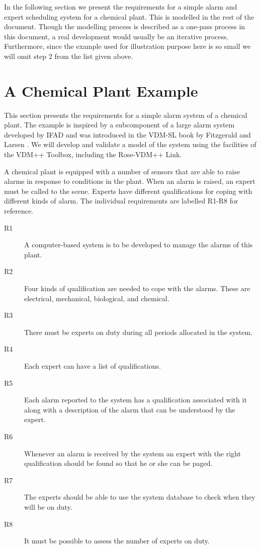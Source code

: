 \documentclass[\pformat,12pt,twoside]{article}
\begin{document}
In the following section we present the requirements for a simple 
alarm and expert scheduling system for a chemical plant. This 
is modelled in the rest of the document. Though the modelling 
process is described as a one-pass process in this document, 
a real development would usually be an iterative process. Furthermore,
since the example used for illustration purpose here is so
small we will omit step 2 from the list given above.

\section{A Chemical Plant Example}

This section presents the requirements for a simple alarm system 
of a chemical plant. The example is inspired by a subcomponent 
of a large alarm system developed by IFAD and was introduced 
in the VDM-SL book by Fitzgerald and Larsen \cite{Fitzgerald&98b}. 
We will develop and validate a model of the system using the 
facilities of the VDM++ Toolbox, including the Rose-VDM++ Link.

A chemical plant is equipped with a number of sensors that are 
able to raise alarms in response to conditions in the plant. 
When an alarm is raised, an expert must be called to the scene. 
Experts have different qualifications for coping with different 
kinds of alarm. The individual requirements are labelled R1-R8 
for reference.

\begin{description}
\item[R1] A computer-based system is to be developed to manage the alarms 
of this plant.
\item[R2] Four kinds of qualification are needed to cope with the alarms. 
These are electrical, mechanical, biological, and chemical.
\item[R3] There must be experts on duty during all periods allocated in 
the system.
\item[R4] Each expert can have a list of qualifications.
\item[R5] Each alarm reported to the system has a qualification associated 
with it along with a description of the alarm that can be understood 
by the expert.
\item[R6] Whenever an alarm is received by the system an expert with the 
right qualification should be found so that he or she can be 
paged.
\item[R7] The experts should be able to use the system database to check 
when they will be on duty.
\item[R8] It must be possible to assess the number of experts on duty.
\end{description}
\end{document}
